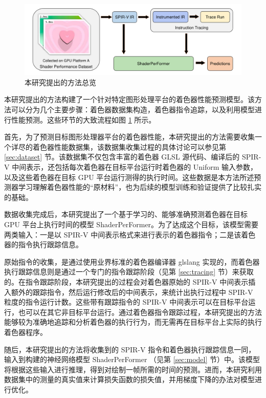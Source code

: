 \begin{figure}[h]
  \centering
  \includegraphics[width=1\linewidth]{figures/OverviewNewNewNew.pdf}
  \caption{本研究提出的方法总览}
  \label{fig:pipeline_overview}
\end{figure}


本研究提出的方法构建了一个针对特定图形处理平台的着色器性能预测模型。该方法可以分为几个主要步骤：着色器数据集构造，着色器指令追踪，以及利用模型进行性能预测。这些环节的大致流程如图 \ref{fig:pipeline_overview} 所示。

首先，为了预测目标图形处理器平台的着色器性能，本研究提出的方法需要收集一个详尽的着色器性能数据集，该数据集收集过程的具体讨论可以参见第 \ref{sec:dataset} 节。该数据集不仅包含丰富的着色器 GLSL 源代码、编译后的 SPIR-V 中间表示，还包括每次着色器在目标平台运行时着色器的 Uniform 输入参数，以及这些着色器在目标 GPU 平台运行测得的执行时间。这些数据是本方法所述预测器学习理解着色器性能的“原材料”，也为后续的模型训练和验证提供了比较扎实的基础。

数据收集完成后，本研究提出了一个基于学习的、能够准确预测着色器在目标 GPU 平台上执行时间的模型 ShaderPerFormer。为了达成这个目标，该模型需要两类输入：一是以 SPIR-V 中间表示格式来进行表示的着色器指令；二是该着色器的指令执行跟踪信息。

原始指令的收集，是通过使用业界标准的着色器编译器 glslang \cite{glslang} 实现的，而着色器执行跟踪信息则是通过一个专门的指令跟踪阶段（见第 \ref{sec:tracing} 节）来获取的。在指令跟踪阶段，本研究提出的过程会对着色器原始的 SPIR-V 中间表示插入额外的跟踪指令，然后运行修改后的中间表示，来统计出执行过程中 SPIR-V 粒度的指令运行计数。这些带有跟踪指令的 SPIR-V 中间表示可以在目标平台运行，也可以在其它非目标平台运行。通过着色器指令跟踪过程，本研究提出的方法能够较为准确地追踪和分析着色器的执行行为，而无需再在目标平台上实际的执行着色器程序。

随后，本研究提出的方法将收集到的 SPIR-V 指令和着色器执行跟踪信息一同，输入到构建的神经网络模型 ShaderPerFormer （见第 \ref{sec:model} 节）中。该模型将根据这些输入进行推理，得到对绘制一帧所需的时间的预测。进而，本研究利用数据集中的测量的真实值来计算损失函数的损失值，并用梯度下降的办法对模型进行优化。


